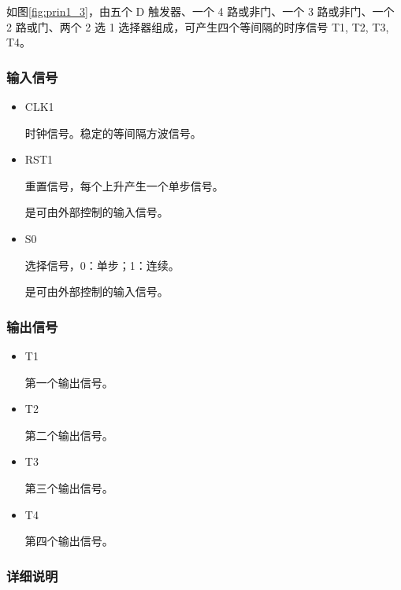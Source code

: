 如图\ref{fig:prin1_3}，由五个 D 触发器、一个 4 路或非门、一个 3 路或非门、一个 2 路或门、两个 2 选 1 选择器组成，可产生四个等间隔的时序信号 T1, T2, T3, T4。

\subsubsection{输入信号}

\begin{itemize}
    \item CLK1
    
    时钟信号。稳定的等间隔方波信号。
    
    \item RST1
    
    重置信号，每个上升产生一个单步信号。
    
    是可由外部控制的输入信号。
    
    \item S0
    
    选择信号，0：单步；1：连续。
    
    是可由外部控制的输入信号。
    
\end{itemize} 

\subsubsection{输出信号}

\begin{itemize}
    \item T1
    
    第一个输出信号。
    
    \item T2
    
    第二个输出信号。

    \item T3

    第三个输出信号。

    \item T4
    
    第四个输出信号。

\end{itemize}

\subsubsection{详细说明}

